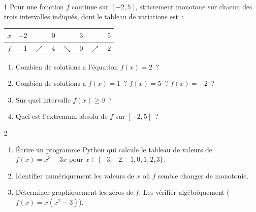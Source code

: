 \begin{exo}{1}
Pour une fonction $f$ continue sur $[-2,5]$, strictement monotone sur
chacun des trois intervalles indiqu\'es, dont le tableau de variations est~:
\begin{center}
\renewcommand{\arraystretch}{1.8}
\begin{tabular}{|c|ccccccc|}
\hline
$x$ & $-2$ & & $0$ & & $3$ & & $5$ \\
\hline
$f$ & $-1$ & $\nearrow$ & $4$ & $\searrow$ & $0$ & $\nearrow$ & $2$ \\
\hline
\end{tabular}
\end{center}
\begin{enumerate}
  \item Combien de solutions a l'\'equation $f(x)=2$~?
  \item Combien de solutions a $f(x)=1$~? $f(x)=5$~? $f(x)=-2$~?
  \item Sur quel intervalle $f(x)\geq0$~?
  \item Quel est l'extremum absolu de $f$ sur $[-2,5]$~?
\end{enumerate}
\end{exo}

\begin{exo}{2}
\begin{enumerate}
  \item \'Ecrire un programme Python qui calcule le tableau de valeurs
        de $f(x)=x^3-3x$ pour $x\in\{-3,-2,-1,0,1,2,3\}$.
  \item Identifier num\'eriquement les valeurs de $x$ o\`u $f$ semble changer
        de monotonie.
  \item D\'eterminer graphiquement les z\'eros de $f$.
        Les v\'erifier alg\'ebriquement ($f(x)=x(x^2-3)$).
\end{enumerate}
\end{exo}

